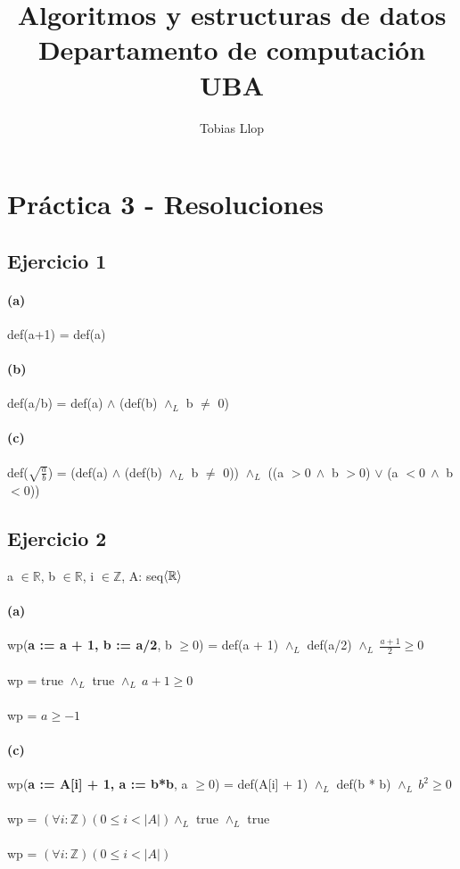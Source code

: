 \documentclass{article}
\title{Algoritmos y estructuras de datos
       \\ Departamento de computación UBA}
\author{Tobias Llop}
\date{}
\begin{document}
\maketitle
\setcounter{section}{2}
\section{Práctica 3 - Resoluciones}
\subsection{Ejercicio 1} 

\paragraph{(a)} def(a+1) = def(a)
\paragraph{(b)} def(a/b) = def(a) \(\land\) (def(b) \(\land_L\) b \(\neq\) 0) 
\paragraph{(c)} def(\( \sqrt{\frac{a}{b}}\)) = (def(a) \(\land\) (def(b) \(\land_L\) b \(\neq\) 0)) \( \land_L\) ((a \(>0 \: \land \) b \(>0\)) \( \lor \) (a \(<0 \: \land \) b \(<0\)))

\subsection{Ejercicio 2}
a \(\in \mathbb{R}\), b \(\in \mathbb{R}\), i \(\in \mathbb{Z}\), A: seq\(\braket{\mathbb{R}}\) 

\paragraph{(a)} wp(\textbf{a := a + 1, b := a/2}, b \(\geq 0 \)) = def(a + 1) \(\land_L\) def(a/2)  \(\land_L \: \frac{a+1}{2} \geq 0\) \\ \\
\setlength{\parindent}{59mm}\indent wp =  true \(\land_L\) true \(\land_L \: a+1 \geq 0\) \\ \\
\setlength{\parindent}{59mm}\indent wp = \( a \geq -1\)

\paragraph{(c)} wp(\textbf{a := A[i] + 1, a := b*b}, a \(\geq 0 \)) = def(A[i] + 1) \(\land_L\) def(b * b)  \(\land_L \: b^2 \geq 0\) \\ \\
\setlength{\parindent}{59mm}\indent wp = \((\forall i:\mathbb{Z})(0 \leq i < |A| )   \land_L\) true \(\land_L\) true \\ \\
\setlength{\parindent}{59mm}\indent wp = \((\forall i:\mathbb{Z})(0 \leq i < |A| )\)
\end{document}
